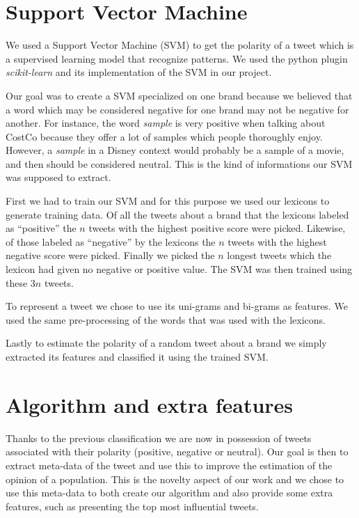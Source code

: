 \documentclass[a4paper,12pt]{report}
\begin{document}
\section{Support Vector Machine}

We used a Support Vector Machine (SVM) to get the polarity of a tweet which is a supervised learning model that recognize patterns. We used the python plugin \textit{scikit-learn}\cite{Scikit} and its implementation of the SVM in our project.

Our goal was to create a SVM specialized on one brand because we believed that a word which may be considered negative for one brand may not be negative for another.
For instance, the word \textit{sample} is very positive when talking about CostCo because they offer a lot of samples which people thoroughly enjoy. However, a \textit{sample} in a Disney context would probably be a sample of a movie, and then should be considered neutral.
This is the kind of informations our SVM was supposed to extract.

First we had to train our SVM and for this purpose we used our lexicons to generate training data. Of all the tweets about a brand that the lexicons labeled as ``positive'' the $n$ tweets with the highest positive score were picked. Likewise, of those labeled as ``negative'' by the lexicons the $n$ tweets with the highest negative score were picked. Finally we picked the $n$ longest tweets which the lexicon had given no negative or positive value. The SVM was then trained using these $3n$ tweets.

To represent a tweet we chose to use its uni-grams and bi-grams as features. We used the same pre-processing of the words that was used with the lexicons.

Lastly to estimate the polarity of a random tweet about a brand we simply extracted its features and classified it using the trained SVM.

\section{Algorithm and extra features}

Thanks to the previous classification we are now in possession of tweets associated with their polarity (positive, negative or neutral). Our goal is then to extract meta-data of the tweet and use this to improve the estimation of the opinion of a population.
This is the novelty aspect of our work and we chose to use this meta-data to both create our algorithm and also provide some extra features, such as presenting the top most influential tweets.
\end{document}
